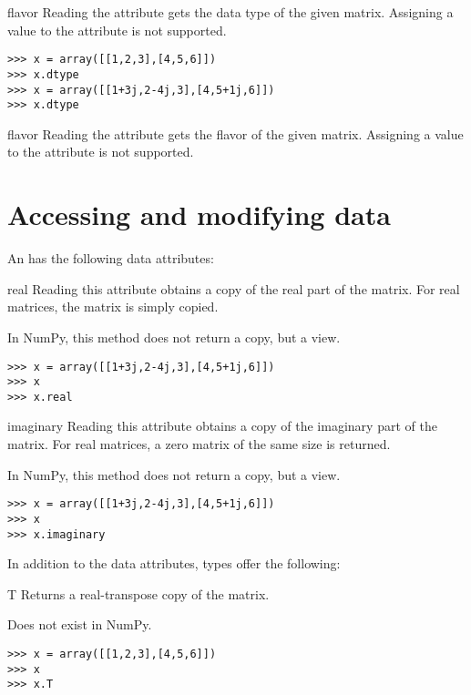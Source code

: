 \begin{memberdesc}[Array]{flavor}
  Reading the  attribute gets the data type of the given
  matrix. Assigning a value to the  attribute is not supported.
\begin{verbatim}
>>> x = array([[1,2,3],[4,5,6]])
>>> x.dtype
>>> x = array([[1+3j,2-4j,3],[4,5+1j,6]])
>>> x.dtype
\end{verbatim}
\end{memberdesc}

\begin{memberdesc}[Array]{flavor}
  Reading the  attribute gets the flavor of the given
  matrix. Assigning a value to the  attribute is not supported.
\end{memberdesc}
\section{Accessing and modifying  data}

An  has the following data attributes:

\begin{memberdesc}[Array]{real}
  Reading this attribute obtains a copy of the real part of the matrix.
  For real matrices, the matrix is simply copied.

  In NumPy, this method does not return a copy, but a view.
\begin{verbatim}
>>> x = array([[1+3j,2-4j,3],[4,5+1j,6]])
>>> x
>>> x.real
\end{verbatim}
\end{memberdesc}

\begin{memberdesc}[Array]{imaginary}
  Reading this attribute obtains a copy of the imaginary part of the matrix.
  For real matrices, a zero matrix of the same size is returned.

  In NumPy, this method does not return a copy, but a view.
\begin{verbatim}
>>> x = array([[1+3j,2-4j,3],[4,5+1j,6]])
>>> x
>>> x.imaginary
\end{verbatim}
\end{memberdesc}

In addition to the  data attributes,  types
offer the following:

\begin{memberdesc}[Matrix]{T}
  Returns a real-transpose copy of the matrix.

  Does not exist in NumPy.
\begin{verbatim}
>>> x = array([[1,2,3],[4,5,6]])
>>> x
>>> x.T
\end{verbatim}
\end{memberdesc}

